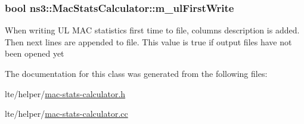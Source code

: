 \subsubsection[{\texorpdfstring{m\+\_\+ul\+First\+Write}{m_ulFirstWrite}}]{\setlength{\rightskip}{0pt plus 5cm}bool ns3\+::\+Mac\+Stats\+Calculator\+::m\+\_\+ul\+First\+Write\hspace{0.3cm}{\ttfamily [private]}}\hypertarget{classns3_1_1MacStatsCalculator_ade5ada157fabe3969ce7338ae05997ee}{}\label{classns3_1_1MacStatsCalculator_ade5ada157fabe3969ce7338ae05997ee}
When writing UL M\+AC statistics first time to file, columns description is added. Then next lines are appended to file. This value is true if output files have not been opened yet 

The documentation for this class was generated from the following files\+:\begin{DoxyCompactItemize}
\item 
lte/helper/\hyperlink{mac-stats-calculator_8h}{mac-\/stats-\/calculator.\+h}\item 
lte/helper/\hyperlink{mac-stats-calculator_8cc}{mac-\/stats-\/calculator.\+cc}\end{DoxyCompactItemize}
